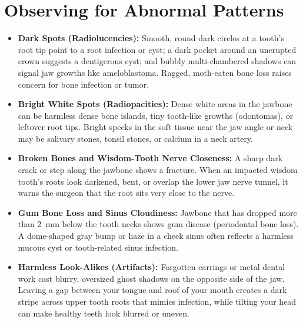 \section{Observing for Abnormal Patterns}
\begin{itemize}
\item \textbf{Dark Spots (Radiolucencies):} Smooth, round dark circles at a tooth's root tip point to a root infection or cyst; a dark pocket around an unerupted crown suggests a dentigerous cyst; and bubbly multi-chambered shadows can signal jaw growths like ameloblastoma. Ragged, moth-eaten bone loss raises concern for bone infection or tumor.
\item \textbf{Bright White Spots (Radiopacities):} Dense white areas in the jawbone can be harmless dense bone islands, tiny tooth-like growths (odontomas), or leftover root tips. Bright specks in the soft tissue near the jaw angle or neck may be salivary stones, tonsil stones, or calcium in a neck artery.
\item \textbf{Broken Bones and Wisdom-Tooth Nerve Closeness:} A sharp dark crack or step along the jawbone shows a fracture. When an impacted wisdom tooth's roots look darkened, bent, or overlap the lower jaw nerve tunnel, it warns the surgeon that the root sits very close to the nerve.
\item \textbf{Gum Bone Loss and Sinus Cloudiness:} Jawbone that has dropped more than 2~mm below the tooth necks shows gum disease (periodontal bone loss). A dome-shaped gray bump or haze in a cheek sinus often reflects a harmless mucous cyst or tooth-related sinus infection.
\item \textbf{Harmless Look-Alikes (Artifacts):} Forgotten earrings or metal dental work cast blurry, oversized ghost shadows on the opposite side of the jaw. Leaving a gap between your tongue and roof of your mouth creates a dark stripe across upper tooth roots that mimics infection, while tilting your head can make healthy teeth look blurred or uneven.
\end{itemize}

